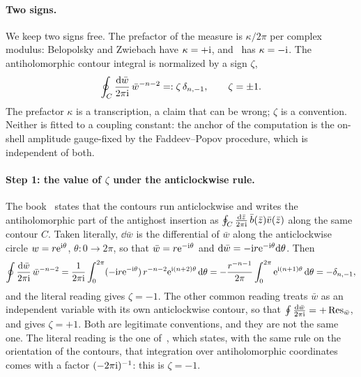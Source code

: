 \paragraph{Two signs.}
We keep two signs free.
The prefactor of the measure is $\kappa / 2\pi$ per complex modulus: Belopolsky and Zwiebach have $\kappa = + \mathrm{i}$, and~\cite{Erbin:2021:StringFieldTheory} has $\kappa = - \mathrm{i}$.
The antiholomorphic contour integral is normalized by a sign $\zeta$,
\begin{equation}
  \label{eq:conv:zeta}
  \oint_C \frac{\mathrm{d} \bar w}{2\pi \mathrm{i}} \, \bar w^{-n-2}
    =: \zeta \, \delta_{n,-1},
  \qquad
  \zeta
    = \pm 1.
\end{equation}
The prefactor $\kappa$ is a transcription, a claim that can be wrong; $\zeta$ is a convention.
Neither is fitted to a coupling constant: the anchor of the computation is the on-shell amplitude gauge-fixed by the Faddeev--Popov procedure, which is independent of both.

\paragraph{Step 1: the value of $\zeta$ under the anticlockwise rule.}
The book~\cite{Erbin:2021:StringFieldTheory} states that the contours run anticlockwise and writes the antiholomorphic part of the antighost insertion as $\oint_C \frac{\mathrm{d} \bar z}{2\pi \mathrm{i}} \, \bar b(\bar z) \bar v(\bar z)$ along the same contour $C$.
Taken literally, $\dd \bar w$ is the differential of $\bar w$ along the anticlockwise circle $w = r \mathrm{e}^{\mathrm{i} \theta}$, $\theta \colon 0 \to 2\pi$, so that $\bar w = r \mathrm{e}^{- \mathrm{i} \theta}$ and $\mathrm{d} \bar w = - \mathrm{i} r \mathrm{e}^{- \mathrm{i} \theta} \mathrm{d} \theta$.
Then
\begin{equation}
  \label{eq:conv:zeta-literal}
  \oint \frac{\mathrm{d} \bar w}{2\pi \mathrm{i}} \, \bar w^{-n-2}
    = \frac{1}{2\pi \mathrm{i}} \int_0^{2\pi} (- \mathrm{i} r \mathrm{e}^{- \mathrm{i} \theta}) \, r^{-n-2} \mathrm{e}^{\mathrm{i} (n+2) \theta} \, \mathrm{d} \theta
    = - \frac{r^{-n-1}}{2\pi} \int_0^{2\pi} \mathrm{e}^{\mathrm{i} (n+1) \theta} \, \mathrm{d} \theta
    = - \delta_{n,-1},
\end{equation}
and the literal reading gives $\zeta = -1$.
The other common reading treats $\bar w$ as an independent variable with its own anticlockwise contour, so that $\oint \frac{\mathrm{d} \bar w}{2\pi \mathrm{i}} = + \operatorname{Res}_{\bar w}$, and gives $\zeta = + 1$.
Both are legitimate conventions, and they are not the same one.
The literal reading is the one of~\cite{deLacroix:2017:ClosedSuperstringField}, which states, with the same rule on the orientation of the contours, that integration over antiholomorphic coordinates comes with a factor $(- 2\pi \mathrm{i})^{-1}$: this is $\zeta = -1$.

